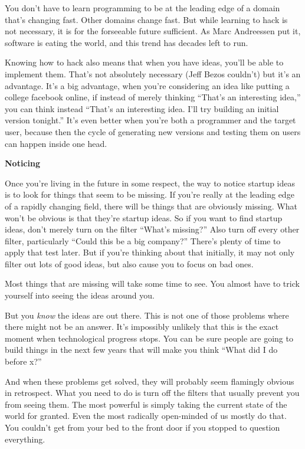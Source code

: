 You don't have to learn programming to be at the leading edge of a
domain that's changing fast. Other domains change fast. But while
learning to hack is not necessary, it is for the forseeable future
sufficient. As Marc Andreessen put it, software is eating the world, and
this trend has decades left to run.

Knowing how to hack also means that when you have ideas, you'll be able
to implement them. That's not absolutely necessary (Jeff Bezos couldn't)
but it's an advantage. It's a big advantage, when you're considering an
idea like putting a college facebook online, if instead of merely
thinking ``That's an interesting idea,'' you can think instead ``That's
an interesting idea. I'll try building an initial version tonight.''
It's even better when you're both a programmer and the target user,
because then the cycle of generating new versions and testing them on
users can happen inside one head.

\textbf{Noticing}

Once you're living in the future in some respect, the way to notice
startup ideas is to look for things that seem to be missing. If you're
really at the leading edge of a rapidly changing field, there will be
things that are obviously missing. What won't be obvious is that they're
startup ideas. So if you want to find startup ideas, don't merely turn
on the filter ``What's missing?'' Also turn off every other filter,
particularly ``Could this be a big company?'' There's plenty of time to
apply that test later. But if you're thinking about that initially, it
may not only filter out lots of good ideas, but also cause you to focus
on bad ones.

Most things that are missing will take some time to see. You almost have
to trick yourself into seeing the ideas around you.

But you \emph{know} the ideas are out there. This is not one of those
problems where there might not be an answer. It's impossibly unlikely
that this is the exact moment when technological progress stops. You can
be sure people are going to build things in the next few years that will
make you think ``What did I do before x?''

And when these problems get solved, they will probably seem flamingly
obvious in retrospect. What you need to do is turn off the filters that
usually prevent you from seeing them. The most powerful is simply taking
the current state of the world for granted. Even the most radically
open-minded of us mostly do that. You couldn't get from your bed to the
front door if you stopped to question everything.

